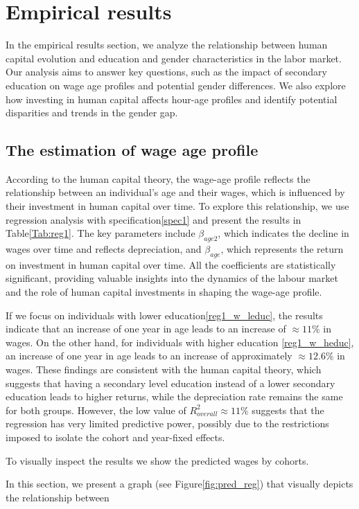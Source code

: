 \documentclass[12pt]{article}
\begin{document}
\section{Empirical results}
In the empirical results section, we analyze the relationship between human capital evolution and education and gender
characteristics in the labor market. Our analysis aims to answer key questions, such as the impact of secondary
education on wage age profiles and potential gender differences. We also explore how investing in human capital affects
hour-age profiles and identify potential disparities and trends in the gender gap.
\subsection{The estimation of wage age profile}
According to the human capital theory, the wage-age profile reflects the relationship between an individual's age and
their wages, which is influenced by their investment in human capital over time. To explore this relationship, we use
regression analysis with specification\ref{spec1} and present the results in Table\ref{Tab:reg1}. The key parameters
include $\beta_{age2}$, which indicates the decline in wages over time and reflects depreciation, and $\beta_{age}$,
which represents the return on investment in human capital over time. All the coefficients are statistically
significant, providing valuable insights into the dynamics of the labour market and the role of human capital investments
in shaping the wage-age profile.
\par
If we focus on individuals with lower education\ref{reg1_w_leduc}, the results indicate that an increase of one year in
age leads to an increase of $\approx 11\%$ in wages. On the other hand, for individuals with higher education
\ref{reg1_w_heduc}, an increase of one year in age leads to an increase of approximately $\approx 12.6\%$ in wages.
These findings are consistent with the human capital theory, which suggests that having a secondary level education
instead of a lower secondary education leads to higher returns, while the depreciation rate remains the same for both
groups. However, the low value of $R_{overall}^2 \approx 11\%$ suggests that the regression has very limited predictive
power, possibly due to the restrictions imposed to isolate the cohort and year-fixed effects.
\par
To visually inspect the results we show the predicted wages by cohorts.
\par
In this section, we present a graph (see Figure\ref{fig:pred_reg}) that visually depicts the relationship between
\end{document}
